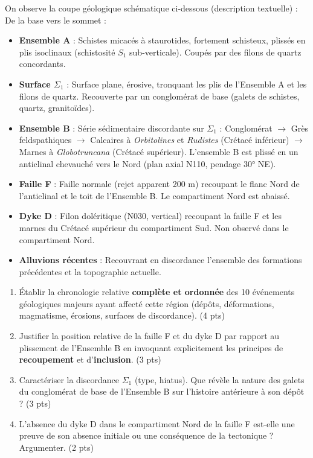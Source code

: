 \documentclass[11pt]{article}
\begin{document}
\begin{exercice}
On observe la coupe géologique schématique ci-dessous (description textuelle) :\\
De la base vers le sommet :
\begin{itemize}
\item \textbf{Ensemble A} : Schistes micacés à staurotides, fortement schisteux, plissés en plis isoclinaux (schistosité $S_1$ sub-verticale). Coupés par des filons de quartz concordants.
\item \textbf{Surface $\Sigma_1$} : Surface plane, érosive, tronquant les plis de l'Ensemble A et les filons de quartz. Recouverte par un conglomérat de base (galets de schistes, quartz, granitoïdes).
\item \textbf{Ensemble B} : Série sédimentaire discordante sur $\Sigma_1$ : Conglomérat $\rightarrow$ Grès feldspathiques $\rightarrow$ Calcaires à \textit{Orbitolines} et \textit{Rudistes} (Crétacé inférieur) $\rightarrow$ Marnes à \textit{Globotruncana} (Crétacé supérieur). L'ensemble B est plissé en un anticlinal chevauché vers le Nord (plan axial N110, pendage 30° NE).
\item \textbf{Faille F} : Faille normale (rejet apparent 200 m) recoupant le flanc Nord de l'anticlinal et le toit de l'Ensemble B. Le compartiment Nord est abaissé.
\item \textbf{Dyke D} : Filon doléritique (N030, vertical) recoupant la faille F et les marnes du Crétacé supérieur du compartiment Sud. Non observé dans le compartiment Nord.
\item \textbf{Alluvions récentes} : Recouvrant en discordance l'ensemble des formations précédentes et la topographie actuelle.
\end{itemize}
\begin{enumerate}
\item Établir la chronologie relative \textbf{complète et ordonnée} des 10 événements géologiques majeurs ayant affecté cette région (dépôts, déformations, magmatisme, érosions, surfaces de discordance). \hfill (4 pts)
\item Justifier la position relative de la faille F et du dyke D par rapport au plissement de l'Ensemble B en invoquant explicitement les principes de \textbf{recoupement} et d'\textbf{inclusion}. \hfill (3 pts)
\item Caractériser la discordance $\Sigma_1$ (type, hiatus). Que révèle la nature des galets du conglomérat de base de l'Ensemble B sur l'histoire antérieure à son dépôt ? \hfill (3 pts)
\item L'absence du dyke D dans le compartiment Nord de la faille F est-elle une preuve de son absence initiale ou une conséquence de la tectonique ? Argumenter. \hfill (2 pts)
\end{enumerate}
\end{exercice}
\end{document}
